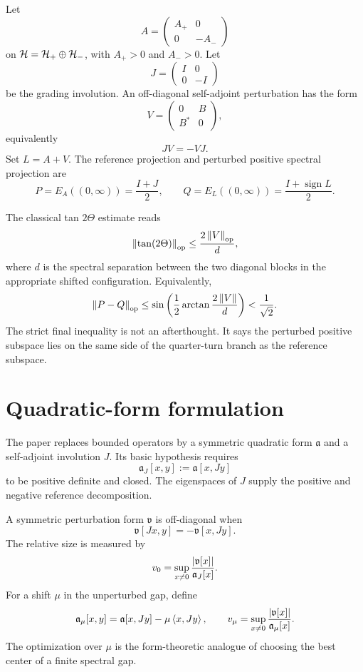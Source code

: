 Let
\[
 A=
 \begin{pmatrix}
 A_+&0\\
 0&-A_-
 \end{pmatrix}
\]
on $\mathcal{H}=\mathcal{H}_+\oplus\mathcal{H}_-$, with $A_+>0$ and $A_->0$. Let
\[
 J=
 \begin{pmatrix}
 I&0\\
 0&-I
 \end{pmatrix}
\]
be the grading involution. An off-diagonal self-adjoint perturbation has the form
\[
 V=
 \begin{pmatrix}
 0&B\\
 B^*&0
 \end{pmatrix},
\]
equivalently
\[
 JV=-VJ.
\]
Set $L=A+V$. The reference projection and perturbed positive spectral projection are
\[
 P=E_A((0,\infty))=\frac{I+J}{2},
 \qquad
 Q=E_L((0,\infty))=\frac{I+\operatorname{sign} L}{2}.
\]

The classical tan $2\Theta$ estimate reads
\[
 \left\lVert \tan(2\Theta)\right\rVert_{\mathrm{op}}
 \le\frac{2\left\lVert V\right\rVert_{\mathrm{op}}}{d},
\]
where $d$ is the spectral separation between the two diagonal blocks in the appropriate shifted configuration. Equivalently,
\[
 \left\lVert P-Q\right\rVert_{\mathrm{op}}
 \le
 \sin\left(\frac12\arctan\frac{2\left\lVert V\right\rVert}{d}\right)
 <\frac{1}{\sqrt2}.
\]
The strict final inequality is not an afterthought. It says the perturbed positive subspace lies on the same side of the quarter-turn branch as the reference subspace.

\section{Quadratic-form formulation}

The paper replaces bounded operators by a symmetric quadratic form $\mathfrak a$ and a self-adjoint involution $J$. Its basic hypothesis requires
\[
 \mathfrak a_J[x,y]:=\mathfrak a[x,Jy]
\]
to be positive definite and closed. The eigenspaces of $J$ supply the positive and negative reference decomposition.

A symmetric perturbation form $\mathfrak v$ is off-diagonal when
\[
 \mathfrak v[Jx,y]=-\mathfrak v[x,Jy].
\]
The relative size is measured by
\[
 v_0
 =
 \sup_{x\ne0}
 \frac{\left\lvert \mathfrak v[x]\right\rvert}{\mathfrak a_J[x]}.
\]
For a shift $\mu$ in the unperturbed gap, define
\[
 \mathfrak a_\mu[x,y]
 =\mathfrak a[x,Jy]-\mu\left\langle x,Jy\right\rangle,
 \qquad
 v_\mu
 =
 \sup_{x\ne0}
 \frac{\left\lvert \mathfrak v[x]\right\rvert}{\mathfrak a_\mu[x]}.
\]
The optimization over $\mu$ is the form-theoretic analogue of choosing the best center of a finite spectral gap.

